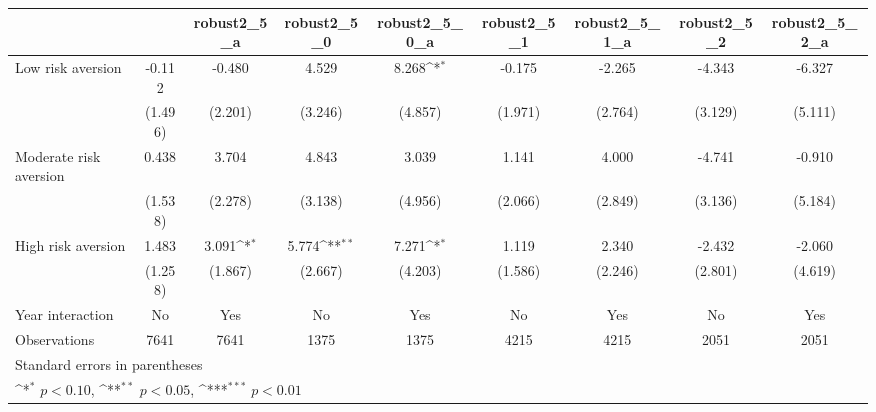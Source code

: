 {
\def\sym#1{\ifmmode^{#1}\else\(^{#1}\)\fi}
\begin{tabular}{l*{8}{c}}
\toprule
                &\multicolumn{1}{c}{}&\multicolumn{1}{c}{robust2\_5\_a}&\multicolumn{1}{c}{robust2\_5\_0}&\multicolumn{1}{c}{robust2\_5\_0\_a}&\multicolumn{1}{c}{robust2\_5\_1}&\multicolumn{1}{c}{robust2\_5\_1\_a}&\multicolumn{1}{c}{robust2\_5\_2}&\multicolumn{1}{c}{robust2\_5\_2\_a}\\
\midrule
Low risk aversion&   -0.112         &   -0.480         &    4.529         &    8.268\sym{*}  &   -0.175         &   -2.265         &   -4.343         &   -6.327         \\
                &  (1.496)         &  (2.201)         &  (3.246)         &  (4.857)         &  (1.971)         &  (2.764)         &  (3.129)         &  (5.111)         \\
\addlinespace
Moderate risk aversion&    0.438         &    3.704         &    4.843         &    3.039         &    1.141         &    4.000         &   -4.741         &   -0.910         \\
                &  (1.538)         &  (2.278)         &  (3.138)         &  (4.956)         &  (2.066)         &  (2.849)         &  (3.136)         &  (5.184)         \\
\addlinespace
High risk aversion&    1.483         &    3.091\sym{*}  &    5.774\sym{**} &    7.271\sym{*}  &    1.119         &    2.340         &   -2.432         &   -2.060         \\
                &  (1.258)         &  (1.867)         &  (2.667)         &  (4.203)         &  (1.586)         &  (2.246)         &  (2.801)         &  (4.619)         \\
\addlinespace
Year interaction &       No         &      Yes         &       No         &      Yes         &       No         &      Yes         &       No         &      Yes         \\
\midrule
Observations    &     7641         &     7641         &     1375         &     1375         &     4215         &     4215         &     2051         &     2051         \\
\bottomrule
\multicolumn{9}{l}{\footnotesize Standard errors in parentheses}\\
\multicolumn{9}{l}{\footnotesize \sym{*} \(p<0.10\), \sym{**} \(p<0.05\), \sym{***} \(p<0.01\)}\\
\end{tabular}
}

